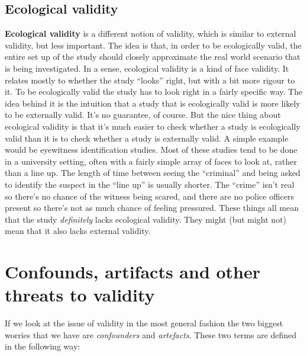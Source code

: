 \documentclass[
]{book}
\begin{document}
\hypertarget{ecological-validity}{%
\subsection{Ecological validity}\label{ecological-validity}}

{\textbf{Ecological validity}} is a different notion of validity, which is similar to external validity, but less important. The idea is that, in order to be ecologically valid, the entire set up of the study should closely approximate the real world scenario that is being investigated. In a sense, ecological validity is a kind of face validity. It relates mostly to whether the study ``looks'' right, but with a bit more rigour to it. To be ecologically valid the study has to look right in a fairly specific way. The idea behind it is the intuition that a study that is ecologically valid is more likely to be externally valid. It's no guarantee, of course. But the nice thing about ecological validity is that it's much easier to check whether a study is ecologically valid than it is to check whether a study is externally valid. A simple example would be eyewitness identification studies. Most of these studies tend to be done in a university setting, often with a fairly simple array of faces to look at, rather than a line up. The length of time between seeing the ``criminal'' and being asked to identify the suspect in the ``line up'' is usually shorter. The ``crime'' isn't real so there's no chance of the witness being scared, and there are no police officers present so there's not as much chance of feeling pressured. These things all mean that the study \emph{definitely} lacks ecological validity. They might (but might not) mean that it also lacks external validity.

\hypertarget{confounds-artifacts-and-other-threats-to-validity}{%
\section{Confounds, artifacts and other threats to validity}\label{confounds-artifacts-and-other-threats-to-validity}}

If we look at the issue of validity in the most general fashion the two biggest worries that we have are \emph{confounders} and \emph{artefacts}. These two terms are defined in the following way:
\end{document}

